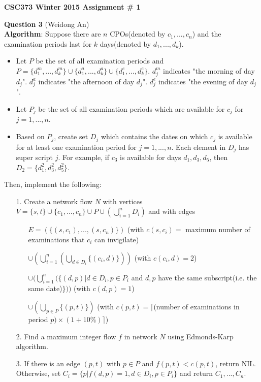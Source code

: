 \documentclass[11pt]{article}
\begin{document}
\begin{center}
{\bf \Large \bf CSC373 Winter 2015 Assignment \# 1}\\
\end{center}
{\bf Question 3} (Weidong An)\\
{\bf Algorithm}: Suppose there are $n$ CPOs(denoted by $c_1, ... , c_n$) and the examination periods last for $k$ days(denoted by $d_1, ..., d_k$).
\begin{itemize}

\item
    Let $P$ be the set of all examination periods and $P = \{d_1^m, ..., d_k^m\}\cup\{d_1^a, ..., d_k^a\}\cup\{d_1^e, ..., d_k^e\}$. $d_j^m$ indicates "the morning of day $d_j$". $d_j^a$ indicates "the afternoon of day $d_j$". $d_j^e$ indicates "the evening of day $d_j$".
\item
    Let $P_j$ be the set of all examination periods which are available for $c_j$ for $j = 1, ..., n$.
\item Based on $P_j$, create set $D_j$ which contains the dates on which $c_j$ is available for at least one examination period for $j = 1, ..., n$. Each element in $D_j$ has super script $j$. For example, if $c_3$ is available for days $d_1, d_3, d_5$, then $D_2 = \{d_1^2, d_3^2, d_5^2\}$.
\end{itemize}
Then, implement the following:
\begin{itemize}
\item[1.]
    Create a network flow $N$ with vertices $V=\{s, t\}\cup\{c_1, ..., c_n\}\cup P \cup (\bigcup_{i=1}^{n} D_i)$ and with edges
    \begin{itemize}
        \item[\textbullet] $E = (\{(s, c_1), ..., (s, c_n)\})$ (with $c(s, c_i) =$ maximum number of examinations that $c_i$ can
            invigilate)
        \item[\textbullet] $\cup(\bigcup_{i = 1}^{n}(\bigcup_{d\in D_i} \{(c_i, d)\}))$ (with $c(c_i, d) = 2$)
        \item[\textbullet] $\cup(\bigcup_{i=1}^{n}(\{(d, p)| d\in D_i, p\in P_i$ and $d, p$ have the same subscript(i.e. the same date)$\}))$ (with $c(d, p) = 1$)
        \item[\textbullet] $\cup(\bigcup_{p\in P} \{(p, t)\})$ (with $c(p, t) = \lceil$(number of examinations in period $p)\times (1+10\%)\rceil$)

    \end{itemize}
\item[2.]
    Find a maximum integer flow $f$ in network $N$ using Edmonds-Karp algorithm.
\item[3.]
    If there is an edge $(p, t)$ with $p \in P$ and $f(p, t) < c(p, t)$, return NIL. Otherwise, set $C_i = \{p|f(d, p)=1, d \in D_i, p\in P_i\}$ and return $C_1, ..., C_n$.
\end{itemize}
\end{document}
